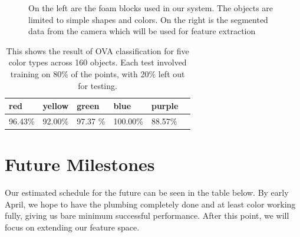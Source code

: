 \documentclass[11pt]{article}
\newcommand\T{\rule{0pt}{3ex}}
\newcommand\B{\rule[-1.2ex]{0pt}{0pt}}
\begin{document}
\begin{figure}
\centering
{}
\caption{On the left are the foam blocks used in our system. The objects are limited to simple shapes and colors. On the right is the segmented data from the camera which will be used for feature extraction}
\label{fig:objects}
\end{figure}

\begin{table}
\centering
\begin{tabular}{ | l | l | l | l | l | l |}
    \hline
    red &  yellow & green & blue & purple \T \B \\ \hline
    96.43\%  & 92.00\% & 97.37 \% & 100.00\% & 88.57\% \B \T \\ \hline
\end{tabular}
\caption{This shows the result of OVA classification for five color types
    across 160 objects. Each test involved training on 80\% of the points,
           with 20\% left out for testing.}
\label{tbl:testresults}
\end{table}
\pagebreak

\section{Future Milestones}
Our estimated schedule for the future can be seen in the table below. By early
April, we hope to have the plumbing completely done and at least color working
fully, giving us bare minimum successful performance. After this point, we
will focus on extending our feature space.
\end{document}
